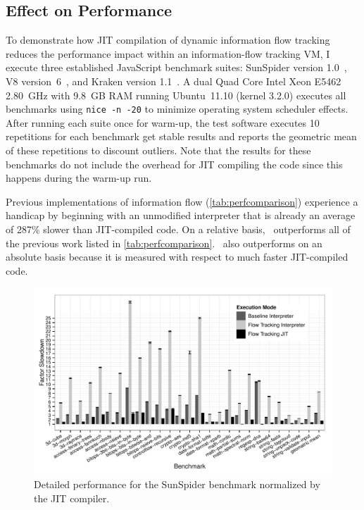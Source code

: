 \subsection{Effect on Performance}
\label{sec:jitflow-evaluation-performance}

To demonstrate how JIT compilation of dynamic information flow tracking reduces the performance impact within an information-flow tracking VM, I execute three established JavaScript benchmark suites:
SunSpider version 1.0~\cite{sunspider}, V8 version~6~\cite{v8}, and Kraken version 1.1~\cite{kraken}.
A dual Quad Core Intel Xeon E5462 2.80~GHz with 9.8~GB RAM running Ubuntu~11.10 (kernel 3.2.0) executes all benchmarks using \texttt{nice~-n~-20} to minimize operating system scheduler effects.
After running each suite once for warm-up, the test software executes 10 repetitions for each benchmark get stable results and reports the geometric mean of these repetitions to discount outliers.
Note that the results for these benchmarks do not include the overhead for JIT compiling the code since this happens during the warm-up run.

Previous implementations of information flow (\autoref{tab:perfcomparison}) experience a handicap by beginning with an unmodified interpreter that is already an average of 287\% slower than JIT-compiled code.
On a relative basis, \JitFlow\ outperforms all of the previous work listed in \autoref{tab:perfcomparison}.
\JitFlow\ also outperforms on an absolute basis because it is measured with respect to much faster JIT-compiled code.

\begin{figure}[ht]
  \centerline{\includegraphics[width=\linewidth,keepaspectratio=true]{graphics/sunspider_plot.pdf}}
  \caption{Detailed performance for the SunSpider benchmark normalized by the  JIT compiler.}
   \label{fig:sunspider-performance}
\end{figure}

